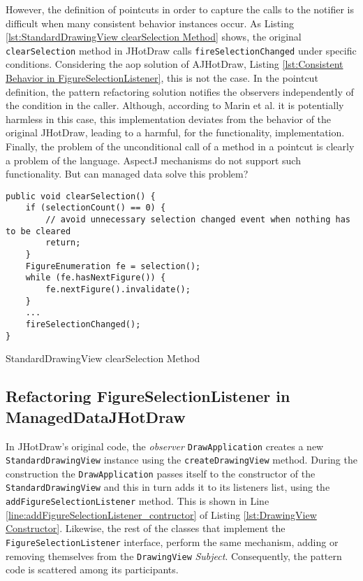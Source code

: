 However, the definition of pointcuts in order to capture the calls to the notifier is difficult when many consistent behavior instances occur. 
As Listing \ref{lst:StandardDrawingView clearSelection Method} shows, the original \texttt{clearSelection} method in JHotDraw calls \texttt{fireSelectionChanged} under specific conditions.
Considering the \ac{aop} solution of AJHotDraw, Listing \ref{lst:Consistent Behavior in FigureSelectionListener}, this is not the case.
In the pointcut definition, the pattern refactoring solution notifies the observers independently of the condition in the caller.
Although, according to Marin et al. it is potentially harmless in this case, this implementation deviates from the behavior of the original JHotDraw, leading to a harmful, for the functionality, implementation.
Finally, the problem of the unconditional call of a method in a pointcut is clearly a problem of the language.
AspectJ mechanisms do not support such functionality.
But can managed data solve this problem?

\begin{sourcecode}
	\begin{lstlisting}[language=AspectJ, escapechar=|]
public void clearSelection() {
	if (selectionCount() == 0) {
		// avoid unnecessary selection changed event when nothing has to be cleared
		return;
	}
	FigureEnumeration fe = selection();
	while (fe.hasNextFigure()) {
		fe.nextFigure().invalidate();
	}
	...
	fireSelectionChanged();
}
	\end{lstlisting}
	\caption{StandardDrawingView clearSelection Method}
	\label{lst:StandardDrawingView clearSelection Method}
\end{sourcecode}

\subsection{Refactoring FigureSelectionListener in ManagedDataJHotDraw}
In JHotDraw's original code, the \textit{observer} \texttt{DrawApplication} creates a new \texttt{StandardDrawingView} instance using the \texttt{createDrawingView} method.
During the construction the \texttt{DrawApplication} passes itself to the constructor of the \texttt{StandardDrawingView} and this in turn adds it to its listeners list, using the \texttt{addFigureSelectionListener} method.
This is shown in Line \ref{line:addFigureSelectionListener_contructor} of Listing \ref{lst:DrawingView Constructor}.
Likewise, the rest of the classes that implement the \texttt{FigureSelectionListener} interface, perform the same mechanism, adding or removing themselves from the \texttt{DrawingView} \textit{Subject}.
Consequently, the pattern code is scattered among its participants.

